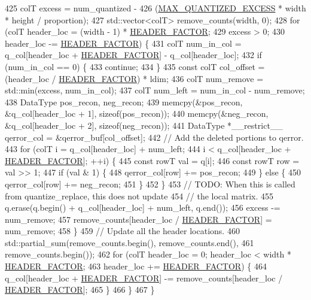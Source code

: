 \begin{DoxyCode}
425     colT excess = num\_quantized -
426                   (\hyperlink{classlbann_1_1lbann__quantizer_abe63d57e62be1b498848f7920de4433a}{MAX\_QUANTIZED\_EXCESS} * width * height / proportion);
427     std::vector<colT> remove\_counts(width, 0);
428     \textcolor{keywordflow}{for} (colT header\_loc = (width - 1) * \hyperlink{classlbann_1_1lbann__quantizer_afb4315625e371169cabfac56c3f75d37}{HEADER\_FACTOR};
429          excess > 0;
430          header\_loc -= \hyperlink{classlbann_1_1lbann__quantizer_afb4315625e371169cabfac56c3f75d37}{HEADER\_FACTOR}) \{
431       colT num\_in\_col = q\_col[header\_loc + \hyperlink{classlbann_1_1lbann__quantizer_afb4315625e371169cabfac56c3f75d37}{HEADER\_FACTOR}] - q\_col[header\_loc];
432       \textcolor{keywordflow}{if} (num\_in\_col == 0) \{
433         \textcolor{keywordflow}{continue};
434       \}
435       \textcolor{keyword}{const} colT col\_offset = (header\_loc / \hyperlink{classlbann_1_1lbann__quantizer_afb4315625e371169cabfac56c3f75d37}{HEADER\_FACTOR}) * ldim;
436       colT num\_remove = std::min(excess, num\_in\_col);
437       colT num\_left = num\_in\_col - num\_remove;
438       DataType pos\_recon, neg\_recon;
439       memcpy(&pos\_recon, &q\_col[header\_loc + 1], \textcolor{keyword}{sizeof}(pos\_recon));
440       memcpy(&neg\_recon, &q\_col[header\_loc + 2], \textcolor{keyword}{sizeof}(neg\_recon));
441       DataType *\_\_restrict\_\_ qerror\_col = &qerror\_buf[col\_offset];
442       \textcolor{comment}{// Add the deleted portions to qerror.}
443       \textcolor{keywordflow}{for} (colT i = q\_col[header\_loc] + num\_left;
444            i < q\_col[header\_loc + \hyperlink{classlbann_1_1lbann__quantizer_afb4315625e371169cabfac56c3f75d37}{HEADER\_FACTOR}]; ++i) \{
445         \textcolor{keyword}{const} rowT val = q[i];
446         \textcolor{keyword}{const} rowT row = val >> 1;
447         \textcolor{keywordflow}{if} (val & 1) \{
448           qerror\_col[row] += pos\_recon;
449         \} \textcolor{keywordflow}{else} \{
450           qerror\_col[row] += neg\_recon;
451         \}
452       \}
453       \textcolor{comment}{// TODO: When this is called from quantize\_replace, this does not update}
454       \textcolor{comment}{// the local matrix.}
455       q.erase(q.begin() + q\_col[header\_loc] + num\_left, q.end());
456       excess -= num\_remove;
457       remove\_counts[header\_loc / \hyperlink{classlbann_1_1lbann__quantizer_afb4315625e371169cabfac56c3f75d37}{HEADER\_FACTOR}] = num\_remove;
458     \}
459     \textcolor{comment}{// Update all the header locations.}
460     std::partial\_sum(remove\_counts.begin(), remove\_counts.end(),
461                      remove\_counts.begin());
462     \textcolor{keywordflow}{for} (colT header\_loc = 0; header\_loc < width * \hyperlink{classlbann_1_1lbann__quantizer_afb4315625e371169cabfac56c3f75d37}{HEADER\_FACTOR};
463          header\_loc += \hyperlink{classlbann_1_1lbann__quantizer_afb4315625e371169cabfac56c3f75d37}{HEADER\_FACTOR}) \{
464       q\_col[header\_loc + \hyperlink{classlbann_1_1lbann__quantizer_afb4315625e371169cabfac56c3f75d37}{HEADER\_FACTOR}] -= remove\_counts[header\_loc / 
      \hyperlink{classlbann_1_1lbann__quantizer_afb4315625e371169cabfac56c3f75d37}{HEADER\_FACTOR}];
465     \}
466   \}
467 \}
\end{DoxyCode}
